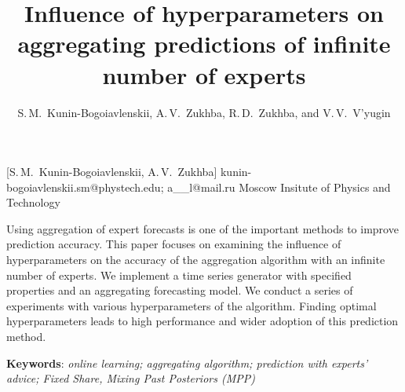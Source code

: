 \documentclass[12pt, twoside]{article}
\begin{document}
\English

\title
    [] %
    {Influence of hyperparameters on aggregating predictions of infinite number of experts} %
\author
    [S.\,M.~Kunin-Bogoiavlenskii] %
    {S.\,M.~Kunin-Bogoiavlenskii, A.\,V.~Zukhba, R.\,D.~Zukhba, and V.\,V.~V’yugin} %
    [S.\,M.~Kunin-Bogoiavlenskii, A.\,V.~Zukhba] %
\email
    {kunin-bogoiavlenskii.sm@phystech.edu; a\_\_l@mail.ru}
\organization
    {Moscow Insitute of Physics and Technology}
\abstract
    {
    
    Using aggregation of expert forecasts is one of the important methods to improve prediction accuracy. 
    This paper focuses on examining the influence of hyperparameters on the accuracy of the aggregation algorithm with an infinite number of experts.
    We implement a time series generator with specified properties and an aggregating forecasting model. 
    We conduct a series of experiments with various hyperparameters of the algorithm.
    Finding optimal hyperparameters leads to high performance and wider adoption of this prediction method.
            
%   
%   
%   
%               
    \noindent
        \textbf{Keywords}: \emph{online learning; aggregating algorithm; prediction with experts’ advice; Fixed Share, Mixing Past Posteriors (MPP)}}

\end{document}
